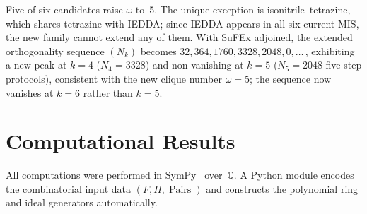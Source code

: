 \documentclass[preprint,12pt]{elsarticle}
\theoremstyle{definition}
\theoremstyle{remark}
\newcommand{\QQ}{\mathbb{Q}}
\DeclareMathOperator{\Pairs}{Pairs}
\begin{document}
\begin{table}[h!]
\centering
\caption{Computational verification of the $\omega = 5$ analysis.
  For each candidate family~$f_9$, we adjoin it to the 8-family system,
  recompute the orthogonality graph, and report $\omega$, the adjacency
  of~$f_9$, and an example MIS of maximum size.}
\label{tab:emerging}
\end{table}

\noindent
Five of six candidates raise $\omega$ to~5.  The unique exception
is isonitrile--tetrazine, which shares tetrazine with IEDDA; since
IEDDA appears in all six current MIS, the new family cannot extend
any of them.  With SuFEx adjoined, the extended orthogonality
sequence $(N_k)$ becomes $32, 364, 1760, 3328, 2048, 0, \ldots$\,,
exhibiting a new peak at $k = 4$ ($N_4 = 3328$) and
non-vanishing at $k = 5$ ($N_5 = 2048$ five-step protocols),
consistent with the new clique number $\omega = 5$; the sequence
now vanishes at $k = 6$ rather than $k = 5$.


\section{Computational Results}\label{sec:computation}

All computations were performed in SymPy~\cite{SymPy}
over~$\QQ$.  A Python module encodes the combinatorial input
data $(F, H, \Pairs)$ and constructs the polynomial ring and
ideal generators automatically.
\end{document}
